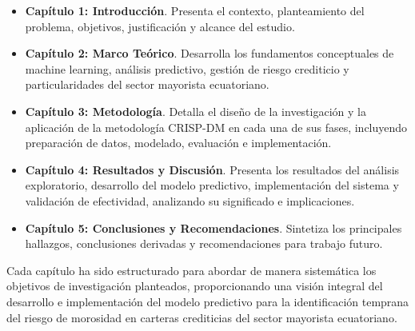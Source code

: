 \begin{itemize}
    \item \textbf{Capítulo 1: Introducción}. Presenta el contexto, planteamiento del problema, objetivos, justificación y alcance del estudio.
    
    \item \textbf{Capítulo 2: Marco Teórico}. Desarrolla los fundamentos conceptuales de machine learning, análisis predictivo, gestión de riesgo crediticio y particularidades del sector mayorista ecuatoriano.
    
    \item \textbf{Capítulo 3: Metodología}. Detalla el diseño de la investigación y la aplicación de la metodología CRISP-DM en cada una de sus fases, incluyendo preparación de datos, modelado, evaluación e implementación.
    
    \item \textbf{Capítulo 4: Resultados y Discusión}. Presenta los resultados del análisis exploratorio, desarrollo del modelo predictivo, implementación del sistema y validación de efectividad, analizando su significado e implicaciones.
    
    \item \textbf{Capítulo 5: Conclusiones y Recomendaciones}. Sintetiza los principales hallazgos, conclusiones derivadas y recomendaciones para trabajo futuro.
\end{itemize}

Cada capítulo ha sido estructurado para abordar de manera sistemática los objetivos de investigación planteados, proporcionando una visión integral del desarrollo e implementación del modelo predictivo para la identificación temprana del riesgo de morosidad en carteras crediticias del sector mayorista ecuatoriano.